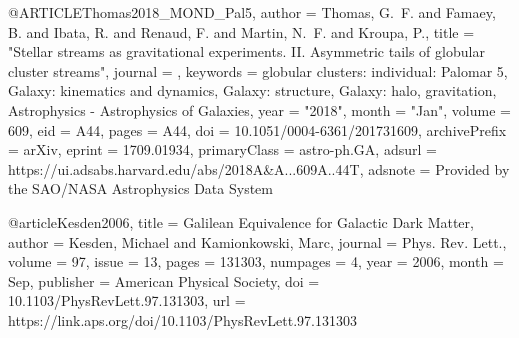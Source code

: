 \documentclass[apj]{emulateapj}
\begin{document}
{{{{{{{{{@ARTICLE{Thomas2018_MOND_Pal5,
       author = {{Thomas}, G.~F. and {Famaey}, B. and {Ibata}, R. and {Renaud}, F. and
         {Martin}, N.~F. and {Kroupa}, P.},
        title = "{Stellar streams as gravitational experiments. II. Asymmetric tails of globular cluster streams}",
      journal = {\aap},
     keywords = {globular clusters: individual: Palomar 5, Galaxy: kinematics and dynamics, Galaxy: structure, Galaxy: halo, gravitation, Astrophysics - Astrophysics of Galaxies},
         year = "2018",
        month = "Jan",
       volume = {609},
          eid = {A44},
        pages = {A44},
          doi = {10.1051/0004-6361/201731609},
archivePrefix = {arXiv},
       eprint = {1709.01934},
 primaryClass = {astro-ph.GA},
       adsurl = {https://ui.adsabs.harvard.edu/abs/2018A&A...609A..44T},
      adsnote = {Provided by the SAO/NASA Astrophysics Data System}
}



@article{Kesden2006,
  title = {Galilean Equivalence for Galactic Dark Matter},
  author = {Kesden, Michael and Kamionkowski, Marc},
  journal = {Phys. Rev. Lett.},
  volume = {97},
  issue = {13},
  pages = {131303},
  numpages = {4},
  year = {2006},
  month = {Sep},
  publisher = {American Physical Society},
  doi = {10.1103/PhysRevLett.97.131303},
  url = {https://link.aps.org/doi/10.1103/PhysRevLett.97.131303}
}


}}}}}}}}}
\end{document}
